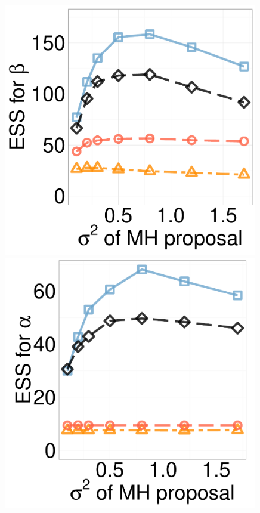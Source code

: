 \begin{figure}[H]
\begin{minipage}[!hp]{0.24\linewidth}
\end{minipage}
  \begin{minipage}[hp]{0.24\linewidth}
  \centering
    \includegraphics [width=0.99\textwidth, angle=0]{figs/ess/EXP_D3beta_k2.pdf}
	\end{minipage}
  \begin{minipage}[hp]{0.24\linewidth}
  \centering
    \includegraphics [width=0.99\textwidth, angle=0]{figs/ess/EXP_D10alpha_k2.pdf}

\end{minipage}
\end{figure}
